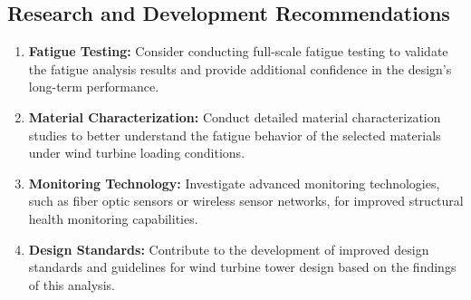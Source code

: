 \documentclass[12pt]{article}
\begin{document}
\subsection{Research and Development Recommendations}

\begin{enumerate}
    \item \textbf{Fatigue Testing:} Consider conducting full-scale fatigue testing to validate the fatigue analysis results and provide additional confidence in the design's long-term performance.
    
    \item \textbf{Material Characterization:} Conduct detailed material characterization studies to better understand the fatigue behavior of the selected materials under wind turbine loading conditions.
    
    \item \textbf{Monitoring Technology:} Investigate advanced monitoring technologies, such as fiber optic sensors or wireless sensor networks, for improved structural health monitoring capabilities.
    
    \item \textbf{Design Standards:} Contribute to the development of improved design standards and guidelines for wind turbine tower design based on the findings of this analysis.
\end{enumerate}
\end{document}
